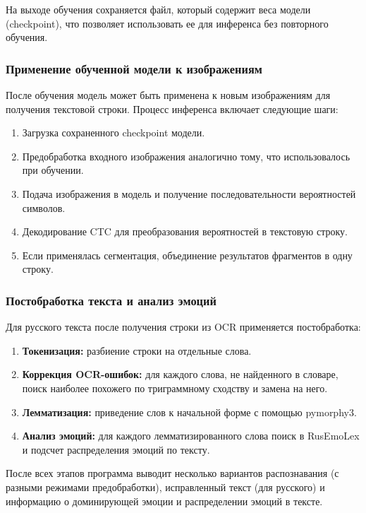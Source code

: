 \documentclass[12pt,a4paper]{article}
\begin{document}
На выходе обучения сохраняется файл, который содержит веса модели (checkpoint), что позволяет
использовать ее для инференса без повторного обучения.

\subsubsection{Применение обученной модели к изображениям}

После обучения модель может быть применена к новым изображениям для получения
текстовой строки. Процесс инференса включает следующие шаги:

\begin{enumerate}
    \item Загрузка сохраненного checkpoint модели.
    \item Предобработка входного изображения аналогично тому, что использовалось при обучении.
    \item Подача изображения в модель и получение последовательности вероятностей символов.
    \item Декодирование CTC для преобразования вероятностей в текстовую строку.
    \item Если применялась сегментация, объединение результатов фрагментов в одну строку.
\end{enumerate}

\subsubsection{Постобработка текста и анализ эмоций}

Для русского текста после получения строки из OCR применяется постобработка:
\begin{enumerate}
    \item \textbf{Токенизация:} разбиение строки на отдельные слова.
    \item \textbf{Коррекция OCR-ошибок:} для каждого слова, не найденного в словаре, поиск наиболее похожего по триграммному сходству и замена на него.
    \item \textbf{Лемматизация:} приведение слов к начальной форме с помощью pymorphy3.
    \item \textbf{Анализ эмоций:} для каждого лемматизированного слова поиск в RusEmoLex и подсчет распределения эмоций по тексту.
\end{enumerate}

После всех этапов программа выводит несколько вариантов распознавания
(с разными режимами предобработки), исправленный текст (для русского)
и информацию о доминирующей эмоции и распределении эмоций в тексте.
\end{document}
